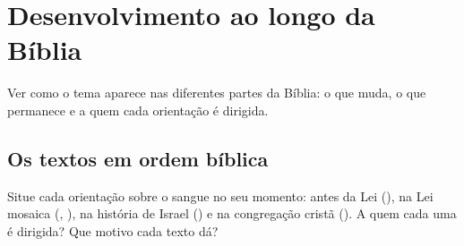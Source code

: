 \chapter{Desenvolvimento ao longo da Bíblia}

\begin{objetivo}
Ver como o tema aparece nas diferentes partes da Bíblia: o que muda, o que
permanece e a quem cada orientação é dirigida.
\end{objetivo}

\distribuicaodotema

\section{Os textos em ordem bíblica}
\textosdotema[ordem=biblica]

\begin{pergunta}
Situe cada orientação sobre o sangue no seu momento: antes da Lei
(), na Lei mosaica (, ), na história de Israel
() e na congregação cristã (). A quem cada uma é
dirigida? Que motivo cada texto dá?
\end{pergunta}

